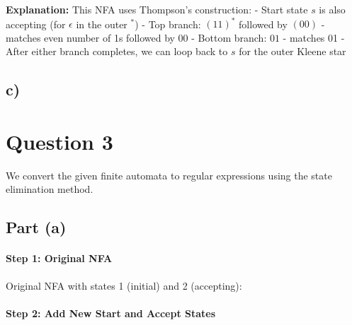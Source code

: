 \documentclass[a4paper, UTF-8]{article}
\theoremstyle{plain}
\begin{document}
\textbf{Explanation:} This NFA uses Thompson's construction:
- Start state $s$ is also accepting (for $\epsilon$ in the outer $^*$)
- Top branch: $(11)^*$ followed by $(00)$ - matches even number of 1s followed by 00
- Bottom branch: $01$ - matches 01
- After either branch completes, we can loop back to $s$ for the outer Kleene star

\subsection{c)}

\begin{center}
\end{center}

\section{Question 3} 

We convert the given finite automata to regular expressions using the state elimination method.

\subsection{Part (a)}

\paragraph{Step 1: Original NFA}

Original NFA with states 1 (initial) and 2 (accepting):

\begin{center}
\end{center}

\paragraph{Step 2: Add New Start and Accept States}
\end{document}
